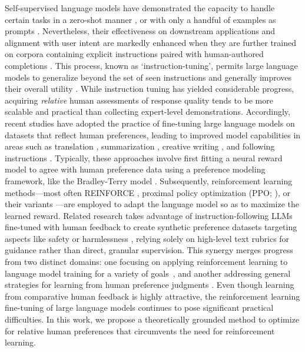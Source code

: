Self-supervised language models have demonstrated the capacity to handle certain tasks in a zero-shot manner \citep{radford2019language}, or with only a handful of examples as prompts \citep{gpt3,megatron,chowdhery2022palm}. Nevertheless, their effectiveness on downstream applications and alignment with user intent are markedly enhanced when they are further trained on corpora containing explicit instructions paired with human-authored completions \citep{mishra-etal-2022-cross,sanh2022multitask,chung2022scaling,thoppilan2022lamda}. This process, known as ‘instruction-tuning’, permits large language models to generalize beyond the set of seen instructions and generally improves their overall utility \citep{chung2022scaling}. While instruction tuning has yielded considerable progress, acquiring \textit{relative} human assessments of response quality tends to be more scalable and practical than collecting expert-level demonstrations. Accordingly, recent studies have adopted the practice of fine-tuning large language models on datasets that reflect human preferences, leading to improved model capabilities in areas such as translation \citep{kreutzer-etal-2018-reliability}, summarization \citep{stiennon2022learning,ziegler2020finetuning}, creative writing \citep{ziegler2020finetuning}, and following instructions \citep{ouyang2022training,ramamurthy2023is}. Typically, these approaches involve first fitting a neural reward model to agree with human preference data using a preference modeling framework, like the Bradley-Terry model \citep{bradley1952rankanalysis}. Subsequently, reinforcement learning methods—most often REINFORCE \citep{williams1992reinforce}, proximal policy optimization (PPO; \cite{schulman2017proximal}), or their variants \citep{ramamurthy2023is}—are employed to adapt the language model so as to maximize the learned reward. Related research takes advantage of instruction-following LLMs fine-tuned with human feedback to create synthetic preference datasets targeting aspects like safety or harmlessness \citep{bai2022constitutional}, relying solely on high-level text rubrics for guidance rather than direct, granular supervision. This synergy merges progress from two distinct domains: one focusing on applying reinforcement learning to language model training for a variety of goals~\citep{Ranzato2015SequenceLT,paulus2018a,wu2018learning}, and another addressing general strategies for learning from human preference judgments \citep{christiano2017deep,kupcsik2018learning}. Even though learning from comparative human feedback is highly attractive, the reinforcement learning fine-tuning of large language models continues to pose significant practical difficulties. In this work, we propose a theoretically grounded method to optimize for relative human preferences that circumvents the need for reinforcement learning.

